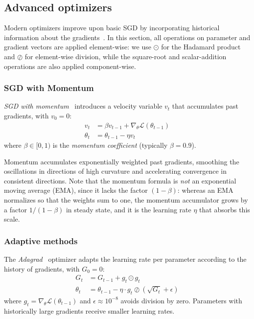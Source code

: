 \subsection{Advanced optimizers}\label{subsec:optimizadores_avanzados}

Modern optimizers improve upon basic \gls{SGD} by incorporating historical information about the gradients~\citep{kingma2014adam, duchi2011adagrad}. In this section, all operations on parameter and gradient vectors are applied element-wise: we use \(\odot\) for the Hadamard product and \(\oslash\) for element-wise division, while the square-root and scalar-addition operations are also applied component-wise.

\subsubsection{SGD with Momentum}

\begin{definition}\label{def:sgd_momentum}
	\textit{SGD with momentum}~\citep{polyak1964methods} introduces a velocity variable \(v_t\) that accumulates past gradients, with \(v_0 = 0\):
	\begin{align*}
		v_t &= \beta v_{t-1} + \nabla_\theta \mathcal{L}(\theta_{t-1}) \\
		\theta_t &= \theta_{t-1} - \eta v_t
	\end{align*}
	where \(\beta \in [0,1)\) is the \textit{momentum coefficient} (typically \(\beta = 0.9\)).
\end{definition}

Momentum accumulates exponentially weighted past gradients, smoothing the oscillations in directions of high curvature and accelerating convergence in consistent directions. Note that the momentum formula is \textit{not} an exponential moving average (EMA), since it lacks the factor \((1-\beta)\): whereas an EMA normalizes so that the weights sum to one, the momentum accumulator grows by a factor \(1/(1-\beta)\) in steady state, and it is the learning rate \(\eta\) that absorbs this scale.

\subsubsection{Adaptive methods}

\begin{definition}[Adagrad]\label{def:adagrad}
	The \textit{Adagrad}~\citep{duchi2011adagrad} optimizer adapts the learning rate per parameter according to the history of gradients, with \(G_0 = 0\):
	\begin{align*}
		G_t &= G_{t-1} + g_t \odot g_t \\
		\theta_t &= \theta_{t-1} - \eta \cdot g_t \oslash (\sqrt{G_t} + \epsilon)
	\end{align*}
	where \(g_t = \nabla_\theta \mathcal{L}(\theta_{t-1})\) and \(\epsilon \approx 10^{-8}\) avoids division by zero. Parameters with historically large gradients receive smaller learning rates.
\end{definition}

